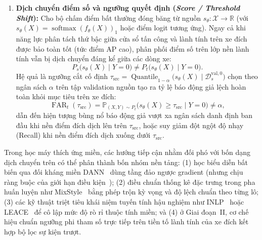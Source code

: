 \documentclass[12pt, a4paper, reqno, oneside]{book}
\begin{document}
\begin{enumerate}
\begin{equation}
    P_s(Y) \neq P_t(Y), \qquad P_s(X \mid Y) = P_t(X \mid Y).
    \end{equation}
    Dịch chuyển tiên nghiệm lớp giải thích tại sao các độ đo phụ thuộc tỷ lệ nền như Precision và F1 biến động mạnh giữa các kịch bản kiểm thử ngay cả khi mô hình duy trì xác suất phát hiện (TPR) và báo động giả (FPR) cố định, củng cố sự cần thiết của các độ đo độc lập tỷ lệ tiên nghiệm như ROC-AUC (đo lường độ phân tách bất biến tỷ lệ nhãn) kết hợp với đường cong PR-AUC / AP (đo lường năng lực xếp hạng không phụ thuộc ngưỡng dưới điều kiện mất cân bằng nhãn sâu sắc).
    \item \textbf{Dịch chuyển điểm số và ngưỡng quyết định (\textit{Score / Threshold Shift}):} Cho bộ chấm điểm bất thường đóng băng từ nguồn $s_\theta : \mathcal{X} \to \mathbb{R}$ (với $s_\theta(X) = \operatorname{softmax}(f_\theta(X))_1$ hoặc điểm logit tương ứng). Ngay cả khi năng lực phân tách thứ bậc giữa cửa sổ tấn công và lành tính trên xe đích được bảo toàn tốt (tức điểm AP cao), phân phối điểm số trên lớp nền lành tính vẫn bị dịch chuyển đáng kể giữa các dòng xe:
    \begin{equation}\label{eq:score-shift}
    P_s\big(s_\theta(X) \mid Y = 0\big) \neq P_t\big(s_\theta(X) \mid Y = 0\big).
    \end{equation}
    Hệ quả là ngưỡng cắt cố định $\tau_{\text{src}} = \operatorname{Quantile}_{1-\alpha}\!\big(s_\theta(X) \mid \mathcal{D}_s^{\text{val},0}\big)$ chọn theo ngân sách $\alpha$ trên tập validation nguồn tạo ra tỷ lệ báo động giả lệch hoàn toàn khỏi mục tiêu trên xe đích:
    \begin{equation}\label{eq:threshold-mismatch}
    \operatorname{FAR}_t(\tau_{\text{src}}) = \mathbb{P}_{(X,Y)\sim P_t}\big(s_\theta(X) \ge \tau_{\text{src}} \mid Y = 0\big) \neq \alpha,
    \end{equation}
    dẫn đến hiện tượng bùng nổ báo động giả vượt xa ngân sách danh định ban đầu khi nền điểm đích dịch lên trên $\tau_{\text{src}}$, hoặc suy giảm đột ngột độ nhạy (Recall) khi nền điểm đích dịch xuống dưới $\tau_{\text{src}}$.
\end{enumerate}

Trong học máy thích ứng miền, các hướng tiếp cận nhằm đối phó với bốn dạng dịch chuyển trên có thể phân thành bốn nhóm nền tảng: (1) học biểu diễn bất biến qua đối kháng miền DANN~\cite{ganin2016dann} dùng tầng đảo ngược gradient (nhưng chịu ràng buộc của giới hạn điều kiện~\cite{zhao2019invariant}); (2) điều chuẩn thống kê đặc trưng trong pha huấn luyện như MixStyle~\cite{zhou2021mixstyle} bằng phép trộn kỳ vọng và độ lệch chuẩn theo từng lô; (3) các kỹ thuật triệt tiêu khái niệm tuyến tính hậu nghiệm như INLP~\cite{ravfogel2020null} hoặc LEACE~\cite{belrose2023leace} để cô lập mức độ rò rỉ thuộc tính miền; và (4) ở Giai đoạn~II, cơ chế hiệu chuẩn ngưỡng phi tham số trực tiếp trên tiền tố lành tính của xe đích kết hợp bộ lọc sự kiện trượt.
\end{document}
